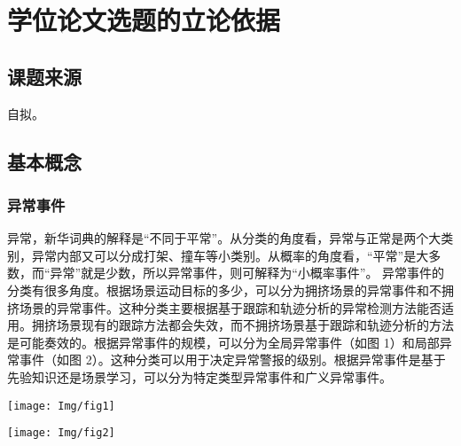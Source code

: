 



\section{学位论文选题的立论依据}


\begin{mdframed}[everyline=true]
	
\subsection{课题来源}
自拟。


\subsection{基本概念}
\subsubsection{异常事件}
异常，新华词典的解释是“不同于平常”。从分类的角度看，异常与正常是两个大类别，异常内部又可以分成打架、撞车等小类别。从概率的角度看，“平常”是大多数，而“异常”就是少数，所以异常事件，则可解释为“小概率事件”。
    异常事件的分类有很多角度。根据场景运动目标的多少，可以分为拥挤场景的异常事件和不拥挤场景的异常事件。这种分类主要根据基于跟踪和轨迹分析的异常检测方法能否适用。拥挤场景现有的跟踪方法都会失效，而不拥挤场景基于跟踪和轨迹分析的方法是可能奏效的。根据异常事件的规模，可以分为全局异常事件（如图 1）和局部异常事件（如图 2）。这种分类可以用于决定异常警报的级别。根据异常事件是基于先验知识还是场景学习，可以分为特定类型异常事件和广义异常事件。

\begin{center}
	\texttt{[image: Img/fig1]}
	\label{fig:fig1}
\end{center}

\begin{center}
	\texttt{[image: Img/fig2]}
	\label{fig:fig2}
\end{center}



\end{mdframed}
